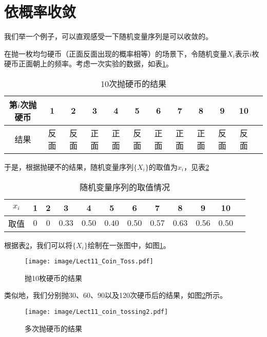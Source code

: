 \section{依概率收敛}
我们举一个例子，可以直观感受一下随机变量序列是可以收敛的。
\begin{example}
在抛一枚均匀硬币（正面反面出现的概率相等）的场景下，令随机变量$X_i$表示$i$枚硬币正面朝上的频率。考虑一次实验的数据，如表\ref{tab:Lect11_cointossing10_result}。
\begin{table}[ht]
\centering
\caption{10次抛硬币的结果}\label{tab:Lect11_cointossing10_result}
\begin{tabular}{c cccccc ccccc}
\hline
    第$i$次抛硬币 & 1 & 2 & 3 & 4 & 5 & 6 & 7 & 8 & 9 & 10  \\
\hline
    结果 & 反面 & 反面 & 正面 & 正面 & 反面 & 正面 & 正面 & 正面 & 反面 & 反面\\ 
 \hline
\end{tabular}
\end{table}

于是，根据抛硬不的结果，随机变量序列$\{X_i\}$的取值为$x_i$，见表\ref{tab:Lect11_cointossing10_frequency}
\begin{table}[ht]
\centering
\caption{随机变量序列的取值情况}\label{tab:Lect11_cointossing10_frequency}
\begin{tabular}{c cccccc ccccc}
\hline
    $x_i$ & 1 & 2 & 3 & 4 & 5 & 6 & 7 & 8 & 9 & 10  \\
\hline
    取值 & $0$ & $0$ & $0.33$ & $0.50$ & $0.40$ & $0.50$ & $0.57$ & $0.63$ & $0.56$ & $0.50$\\ 
 \hline
\end{tabular}
\end{table}

根据表\ref{tab:Lect11_cointossing10_frequency}，我们可以将$\{X_i\}$绘制在一张图中，如图\ref{fig:Lect11_cointossing10_frequency}。

\begin{figure}[h]
    \centering
    \texttt{[image: image/Lect11\_Coin\_Toss.pdf]}
    \caption{抛10枚硬币的结果}
    \label{fig:Lect11_cointossing10_frequency}
\end{figure}
\end{example}

\newpage
类似地，我们分别抛30、60、90以及120次硬币后的结果，如图\ref{fig:Lect11_cointossing2}所示。

\begin{figure}[h]
    \centering
    \texttt{[image: image/Lect11\_coin\_tossing2.pdf]}
    \caption{多次抛硬币的结果}
    \label{fig:Lect11_cointossing2}
\end{figure}

